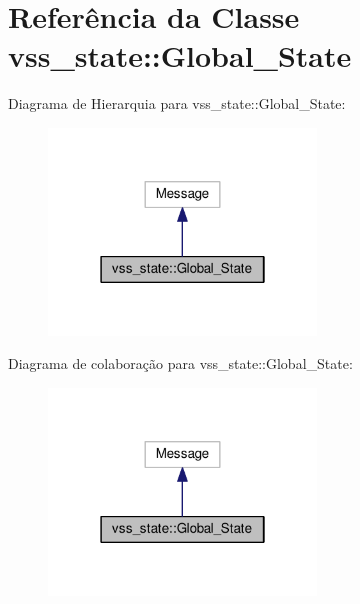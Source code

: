 \hypertarget{classvss__state_1_1Global__State}{}\section{Referência da Classe vss\+\_\+state\+:\+:Global\+\_\+\+State}
\label{classvss__state_1_1Global__State}


Diagrama de Hierarquia para vss\+\_\+state\+:\+:Global\+\_\+\+State\+:\nopagebreak
\begin{figure}[H]
\begin{center}
\leavevmode
\includegraphics[width=202pt]{classvss__state_1_1Global__State__inherit__graph}
\end{center}
\end{figure}


Diagrama de colaboração para vss\+\_\+state\+:\+:Global\+\_\+\+State\+:\nopagebreak
\begin{figure}[H]
\begin{center}
\leavevmode
\includegraphics[width=202pt]{classvss__state_1_1Global__State__coll__graph}
\end{center}
\end{figure}
